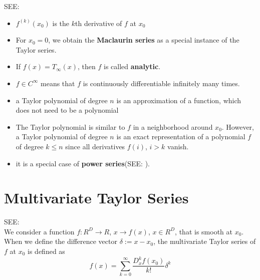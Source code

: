 SEE: 
\begin{itemize}
    \item $f^{(k)}(x_0)$ is the $k$th derivative of $f$ at $x_0$

    \item For $x_0 = 0$, we obtain the \textbf{Maclaurin series}\label{Maclaurin series} as a special instance of the Taylor series. 
    
    \item If $f(x) = T_\infty(x)$, then $f$ is called \textbf{analytic}\label{analytic}.
    
    \item $f \in C^\infty$ means that $f$ is continuously differentiable infinitely many times.

    \item a Taylor polynomial of degree $n$ is an approximation of a function, which does not need to be a polynomial

    \item The Taylor polynomial is similar to $f$ in a neighborhood around $x_0$. However, a Taylor polynomial of degree $n$ is an exact representation of a polynomial $f$ of degree $k \leq n$ since all derivatives $f(i)$, $i > k$ vanish.

    \item it is a special case of \textbf{power series}(SEE: ).

\end{itemize}


\section{Multivariate Taylor Series}\label{Multivariate Taylor Series}

SEE: \\
We consider a function $f : R^D \rightarrow R$, $x \rightarrow f(x)$, $x \in R^D$, that is smooth at $x_0$. When we define the difference vector $\delta := x - x_0$, the multivariate Taylor series of $f$ at $x_0$ is defined as
\[
    f(x) = \sum_{k=0}^{\infty} \displaystyle\frac{D_x^k f(x_0)}{k!}\delta^k
\]

